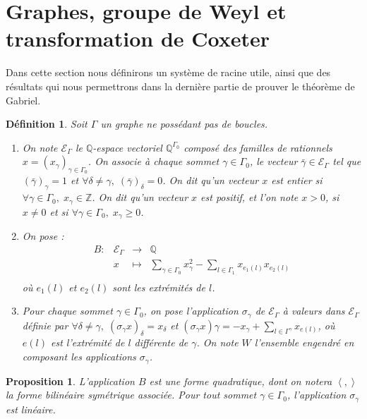 \documentclass[a4paper,10pt]{article}
\newtheorem{defi}[thm]{Définition}%
\newtheorem{prop}[thm]{Proposition}%
\newcommand{\ps}[2]{\left\langle#1,#2\right\rangle}
\begin{document}
\section{Graphes, groupe de Weyl et transformation de Coxeter}
	Dans cette section nous définirons un système de racine utile, ainsi que des résultats qui nous permettrons dans la dernière partie de prouver le théorème de Gabriel.
		\begin{defi}
		Soit $\Gamma$ un graphe ne possédant pas de boucles.
		\begin{enumerate}
			\item On note $\mathscr E_{\Gamma}$ le $\mathbb Q$-espace vectoriel $\mathbb Q^{\Gamma_0}$ composé des familles de rationnels $x=(x_\gamma)_{\gamma\in\Gamma_0}$. On associe à chaque sommet $\gamma\in\Gamma_0$, le vecteur $\bar{\gamma}\in\mathscr E_\Gamma$ tel que $(\bar\gamma)_\gamma=1$ et $\forall \delta\neq\gamma,\;(\bar\gamma)_\delta=0$. On dit qu'un vecteur $x$ est \emph{entier} si $\forall\gamma\in\Gamma_{0},\;x_\gamma\in\mathbb Z$. On dit qu'un vecteur $x$ est \emph{positif}, et l'on note $x>0$, si $x\neq0$ et si $\forall\gamma\in\Gamma_0,\;x_\gamma\geq0$.
			\item On pose :
				\[
				\begin{array}{rccc}
					B:&\mathscr E_{\Gamma}&\longrightarrow&\mathbb Q\\
					&x&\longmapsto&\underset{\gamma\in\Gamma_0}{\sum} x_\gamma^2-\underset{l\in\Gamma_1}{\sum}x_{e_1(l)}x_{e_2(l)}\\
				\end{array}
			\]
			où $e_1(l)$ et $e_2(l)$ sont les extrémités de $l$.
		\item Pour chaque sommet $\gamma\in\Gamma_0$, on pose l'application $\sigma_\gamma$ de $\mathscr E_\Gamma$ à valeurs dans $\mathscr E_\Gamma$ définie par $\forall\delta\neq\gamma,\; (\sigma_\gamma x)_\delta=x_\delta$ et $(\sigma_\gamma x)\gamma=-x_\gamma+\sum_{l\in\Gamma^\gamma}x_{e(l)}$, où $e(l)$ est l'extrémité de $l$ différente de $\gamma$. On note $W$ l'ensemble engendré en composant les applications $\sigma_\gamma$.
		\end{enumerate}
		\end{defi}
		\begin{prop}
			L'application $B$ est une forme quadratique, dont on notera $\ps{}{}$ la forme bilinéaire symétrique associée. Pour tout sommet $\gamma\in\Gamma_0$, l'application $\sigma_\gamma$ est linéaire.
		\end{prop}
\end{document}
